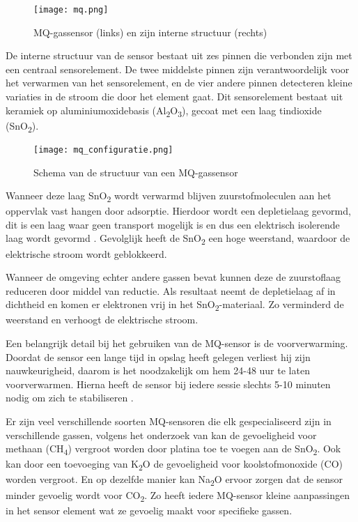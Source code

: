 \begin{figure}[h]
    \texttt{[image: mq.png]}
    \caption[MQ-gassensor]{MQ-gassensor (links) en zijn interne structuur (rechts)}
    \label{fig:mq}
\end{figure}


De interne structuur van de sensor bestaat uit zes pinnen die verbonden zijn met een centraal sensorelement. De twee middelste pinnen zijn verantwoordelijk voor het verwarmen van het sensorelement, en de vier andere pinnen detecteren kleine variaties in de stroom die door het element gaat. Dit sensorelement bestaat uit keramiek op aluminiumoxidebasis (Al\textsubscript{2}O\textsubscript{3}), gecoat met een laag tindioxide (SnO\textsubscript{2}).


\begin{figure}[h]
    \texttt{[image: mq\_configuratie.png]}
    \caption[Schema MQ-gassensor]{Schema van de structuur van een MQ-gassensor \autocite{mq4}}
    \label{fig:mq_configuratie}
\end{figure}

Wanneer deze laag SnO\textsubscript{2} wordt verwarmd blijven zuurstofmoleculen aan het oppervlak vast hangen door adsorptie. Hierdoor wordt een depletielaag gevormd, dit is een laag waar geen transport mogelijk is en dus een elektrisch isolerende laag wordt gevormd \autocite{dr2016}. Gevolglijk heeft de SnO\textsubscript{2} een hoge weerstand, waardoor de elektrische stroom wordt geblokkeerd.

Wanneer de omgeving echter andere gassen bevat kunnen deze de zuurstoflaag reduceren door middel van reductie. Als resultaat neemt de depletielaag af in dichtheid en komen er elektronen vrij in het SnO\textsubscript{2}-materiaal. Zo verminderd de weerstand en verhoogt de elektrische stroom.

Een belangrijk detail bij het gebruiken van de MQ-sensor is de voorverwarming. Doordat de sensor een lange tijd in opslag heeft gelegen verliest hij zijn nauwkeurigheid, daarom is het noodzakelijk om hem 24-48 uur te laten voorverwarmen. Hierna heeft de sensor bij iedere sessie slechts 5-10 minuten nodig om zich te stabiliseren \autocite{Sakayo2019}.

Er zijn veel verschillende soorten MQ-sensoren die elk gespecialiseerd zijn in verschillende gassen, volgens het onderzoek van \textcite{Khodadadi2001} kan de gevoeligheid voor methaan (CH\textsubscript{4}) vergroot worden door platina toe te voegen aan de SnO\textsubscript{2}. Ook kan door een toevoeging van K\textsubscript{2}O de gevoeligheid voor koolstofmonoxide (CO) worden vergroot. En op dezelfde manier kan Na\textsubscript{2}O ervoor zorgen dat de sensor minder gevoelig wordt voor CO\textsubscript{2}. Zo heeft iedere MQ-sensor kleine aanpassingen in het sensor element wat ze gevoelig maakt voor specifieke gassen.

